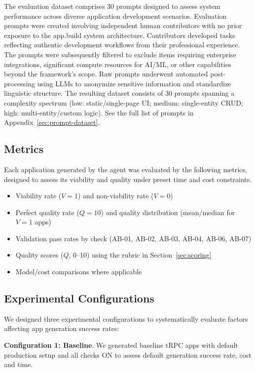 \documentclass{article}
\begin{document}
The evaluation dataset comprises 30 prompts designed to assess system performance across diverse application development scenarios. Evaluation prompts were created involving independent human contributors with no prior exposure to the app.build system architecture. Contributors developed tasks reflecting authentic development workflows from their professional experience. The prompts were subsequently filtered to exclude items requiring enterprise integrations, significant compute resources for AI/ML, or other capabilities beyond the framework's scope. Raw prompts underwent automated post-processing using LLMs to anonymize sensitive information and standardize linguistic structure.
The resulting dataset consists of 30 prompts spanning a complexity spectrum (low: static/single-page UI; medium: single-entity CRUD; high: multi-entity/custom logic).
See the full list of prompts in Appendix~\ref{sec:prompt-dataset}.

\subsection{Metrics}

Each application generated by the agent was evaluated by the following metrics, designed to assess its viability and quality under preset time and cost constraints.

\begin{itemize}
\item Viability rate ($V=1$) and non-viability rate ($V=0$)
\item Perfect quality rate ($Q=10$) and quality distribution (mean/median for $V=1$ apps)
\item Validation pass rates by check (AB-01, AB-02, AB-03, AB-04, AB-06, AB-07)
\item Quality scores ($Q$, 0--10) using the rubric in Section~\ref{sec:scoring}
\item Model/cost comparisons where applicable
\end{itemize}

\subsection{Experimental Configurations}

We designed three experimental configurations to systematically evaluate factors affecting app generation success rates:

\textbf{Configuration 1: Baseline}. We generated baseline tRPC apps with default production setup and all checks ON to assess default generation success rate, cost and time.
\end{document}
